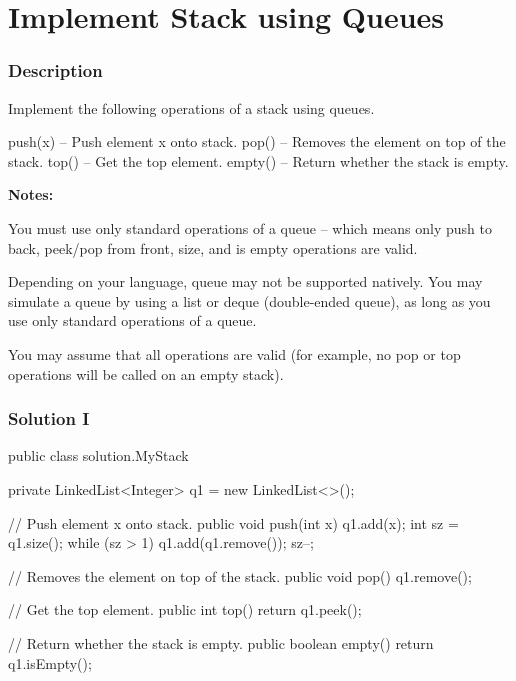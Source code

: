 \newpage

\section{Implement Stack using Queues} %

\subsubsection{Description}
Implement the following operations of a stack using queues.
\begin{Code}
push(x) -- Push element x onto stack.
pop() -- Removes the element on top of the stack.
top() -- Get the top element.
empty() -- Return whether the stack is empty.
\end{Code}

\textbf{Notes:}

You must use only standard operations of a queue -- which means only push to back, peek/pop from front, size, and is empty operations are valid.

Depending on your language, queue may not be supported natively. You may simulate a queue by using a list or deque (double-ended queue), as long as you use only standard operations of a queue.

You may assume that all operations are valid (for example, no pop or top operations will be called on an empty stack).

\subsubsection{Solution I}

\begin{Code}
public class solution.MyStack {
    private LinkedList<Integer> q1 = new LinkedList<>();

    // Push element x onto stack.
    public void push(int x) {
        q1.add(x);
        int sz = q1.size();
        while (sz > 1) {
            q1.add(q1.remove());
            sz--;
        }
    }

    // Removes the element on top of the stack.
    public void pop() {
        q1.remove();
    }


    // Get the top element.
    public int top() {
        return q1.peek();
    }

    // Return whether the stack is empty.
    public boolean empty() {
        return q1.isEmpty();
    }
}
\end{Code}

